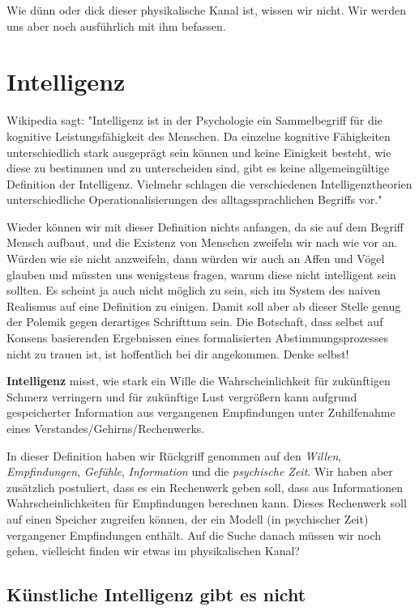 \documentclass[12pt]{book}
\begin{document}
Wie dünn oder dick dieser physikalische Kanal ist, wissen wir nicht. Wir werden uns aber noch ausführlich mit ihm befassen.

\section{Intelligenz}

Wikipedia sagt: "Intelligenz ist in der Psychologie ein Sammelbegriff für die kognitive Leistungsfähigkeit des Menschen. Da einzelne kognitive Fähigkeiten unterschiedlich stark ausgeprägt sein können und keine Einigkeit besteht, wie diese zu bestimmen und zu unterscheiden sind, gibt es keine allgemeingültige Definition der Intelligenz. Vielmehr schlagen die verschiedenen Intelligenztheorien unterschiedliche Operationalisierungen des alltagssprachlichen Begriffs vor."

Wieder können wir mit dieser Definition nichts anfangen, da sie auf dem Begriff Mensch aufbaut, und die Existenz von Menschen zweifeln wir nach wie vor an. Würden wie sie nicht anzweifeln, dann würden wir auch an Affen und Vögel glauben und müssten uns wenigstens fragen, warum diese nicht intelligent sein sollten. Es scheint ja auch nicht möglich zu sein, sich im System des naiven Realismus auf eine Definition zu einigen. Damit soll aber ab dieser Stelle genug der Polemik gegen derartiges Schrifttum sein. Die Botschaft, dass selbst auf Konsens basierenden Ergebnissen eines formalisierten Abstimmungsprozesses nicht zu trauen ist, ist hoffentlich bei dir angekommen. Denke selbst! 

\textbf{Intelligenz} misst, wie stark ein Wille die Wahrscheinlichkeit für zukünftigen Schmerz verringern und für zukünftige Lust vergrößern kann aufgrund gespeicherter Information aus vergangenen Empfindungen unter Zuhilfenahme eines Verstandes/Gehirns/Rechenwerks.

In dieser Definition haben wir Rückgriff genommen auf den \emph{Willen}, \emph{Empfindungen}, \emph{Gefühle}, \emph{Information} und die \emph{psychische Zeit}. Wir haben aber zusätzlich postuliert, dass es ein Rechenwerk geben soll, dass aus Informationen Wahrscheinlichkeiten für Empfindungen berechnen kann. Dieses Rechenwerk soll auf einen Speicher zugreifen können, der ein Modell (in psychischer Zeit) vergangener Empfindungen enthält. Auf die Suche danach müssen wir noch gehen, vielleicht finden wir etwas im physikalischen Kanal?

\subsection{Künstliche Intelligenz gibt es nicht}
\end{document}
